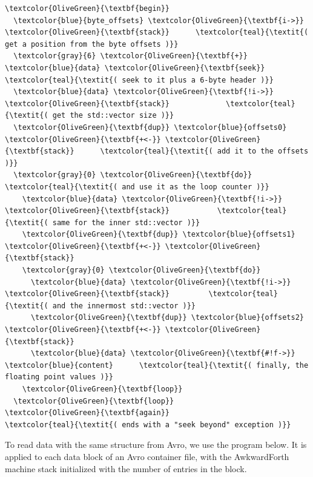 \documentclass{webofc}
\begin{document}
\begin{Verbatim}[commandchars=\\\{\}]
\textcolor{OliveGreen}{\textbf{begin}}
  \textcolor{blue}{byte_offsets} \textcolor{OliveGreen}{\textbf{i->}} \textcolor{OliveGreen}{\textbf{stack}}      \textcolor{teal}{\textit{( get a position from the byte offsets )}}
  \textcolor{gray}{6} \textcolor{OliveGreen}{\textbf{+}} \textcolor{blue}{data} \textcolor{OliveGreen}{\textbf{seek}}               \textcolor{teal}{\textit{( seek to it plus a 6-byte header )}}
  \textcolor{blue}{data} \textcolor{OliveGreen}{\textbf{!i->}} \textcolor{OliveGreen}{\textbf{stack}}             \textcolor{teal}{\textit{( get the std::vector size )}}
  \textcolor{OliveGreen}{\textbf{dup}} \textcolor{blue}{offsets0} \textcolor{OliveGreen}{\textbf{+<-}} \textcolor{OliveGreen}{\textbf{stack}}      \textcolor{teal}{\textit{( add it to the offsets )}}
  \textcolor{gray}{0} \textcolor{OliveGreen}{\textbf{do}}                        \textcolor{teal}{\textit{( and use it as the loop counter )}}
    \textcolor{blue}{data} \textcolor{OliveGreen}{\textbf{!i->}} \textcolor{OliveGreen}{\textbf{stack}}           \textcolor{teal}{\textit{( same for the inner std::vector )}}
    \textcolor{OliveGreen}{\textbf{dup}} \textcolor{blue}{offsets1} \textcolor{OliveGreen}{\textbf{+<-}} \textcolor{OliveGreen}{\textbf{stack}}
    \textcolor{gray}{0} \textcolor{OliveGreen}{\textbf{do}}
      \textcolor{blue}{data} \textcolor{OliveGreen}{\textbf{!i->}} \textcolor{OliveGreen}{\textbf{stack}}         \textcolor{teal}{\textit{( and the innermost std::vector )}}
      \textcolor{OliveGreen}{\textbf{dup}} \textcolor{blue}{offsets2} \textcolor{OliveGreen}{\textbf{+<-}} \textcolor{OliveGreen}{\textbf{stack}}
      \textcolor{blue}{data} \textcolor{OliveGreen}{\textbf{#!f->}} \textcolor{blue}{content}      \textcolor{teal}{\textit{( finally, the floating point values )}}
    \textcolor{OliveGreen}{\textbf{loop}}
  \textcolor{OliveGreen}{\textbf{loop}}
\textcolor{OliveGreen}{\textbf{again}}                         \textcolor{teal}{\textit{( ends with a "seek beyond" exception )}}
\end{Verbatim}

\noindent To read data with the same structure from Avro, we use the program below. It is applied to each data block of an Avro container file, with the AwkwardForth machine stack initialized with the number of entries in the block.
\end{document}

